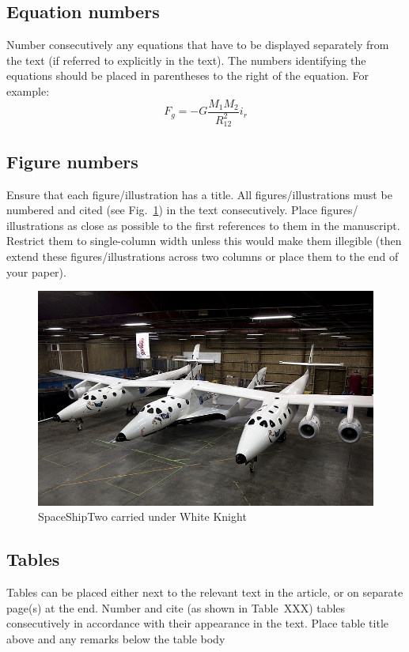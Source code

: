 \documentclass[]{iac}
\begin{document}
\subsection{Equation numbers}
Number consecutively any equations that have to be displayed separately from the text (if referred to explicitly in the text). The numbers identifying the equations should be placed in parentheses to the right of the equation. For example:
\begin{equation}\label{eq:masseq}
    F_g = -G\frac{M_1 M_2}{R_{12}^2}i_r    
\end{equation}

\subsection{Figure numbers}
Ensure that each figure/illustration has a title. All figures/illustrations must be numbered and cited (see Fig.~\ref{fig:testimage}) in the text consecutively. Place figures/ illustrations as close as possible to the first references to them in the manuscript. Restrict them to single-column width unless this would make them illegible (then extend these figures/illustrations across two columns or place them to the end of your paper). 
 \begin{figure}[H]
    \centering
    \includegraphics[width=0.7\linewidth]{Figures/testimage.jpg}
    \caption{SpaceShipTwo carried under White Knight}
    \label{fig:testimage}
\end{figure}

\subsection{Tables}
Tables can be placed either next to the relevant text in the article, or on separate page(s) at the end. Number and cite (as shown in Table~XXX) tables consecutively in accordance with their appearance in the text. Place table title above and any remarks below the table body
\end{document}

